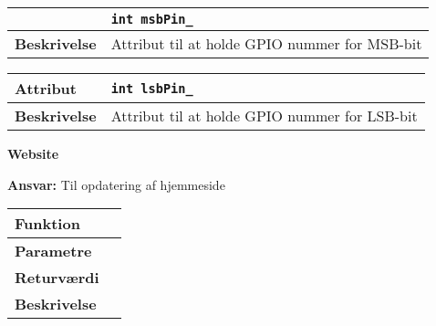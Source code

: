 \begin{center}
\begin{tabular}{ | l | p{} |}
\begin{center}
    \begin{tabular}{ | l | p{} |}
    \hline
    \textbf{Attribut}		& \verb+int msbPin_ +										\\ \hline
    \textbf{Beskrivelse} 	& Attribut til at holde GPIO nummer for MSB-bit				\\ \hline
    \end{tabular}
\end{center}

\begin{center}
    \begin{tabular}{ | l | p{} |}
    \hline
    \textbf{Attribut}		& \verb+int lsbPin_ +		 								\\ \hline
    \textbf{Beskrivelse} 	& Attribut til at holde GPIO nummer for LSB-bit				\\ \hline
    \end{tabular}
\end{center}

{\centering
\textbf{Website}\par
}
\textbf{Ansvar:} Til opdatering af hjemmeside \

\begin{center}
    \begin{tabular}{ | l | p{} |}
    \hline
    \textbf{Funktion}	& \\ \hline
    \textbf{Parametre} 	& \\ \hline
    \textbf{Returværdi}	& \\ \hline
    \textbf{Beskrivelse}	& \\ \hline
    \end{tabular}
\end{center}